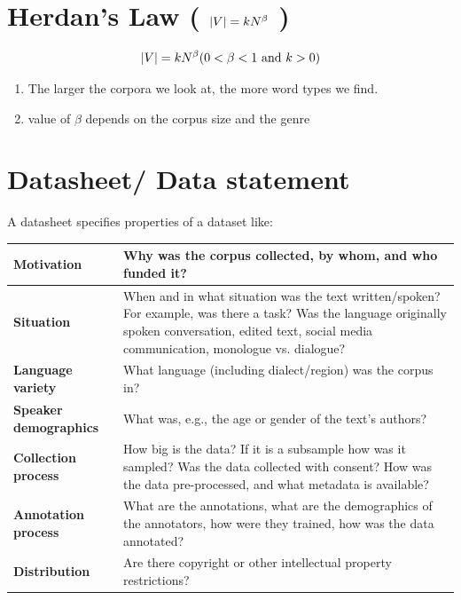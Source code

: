 \section{Herdan’s Law ( $\left| V \right| = kN^{\beta}$ ) \cite{nlp-1}} \label{Herdan’s Law}

\[
    \dabs{V} = kN^{\beta} \hfill (0 < \beta < 1 \text{ and } k > 0)
\]

\begin{enumerate}
    \item The larger the corpora we look at, the more word types we find.
    \item value of $\beta$ depends on the corpus size and the genre
\end{enumerate}

\section{Datasheet/ Data statement}\label{Datasheet/ Data statement}

A datasheet specifies properties of a dataset like:
\begin{alternateColorTable}
\renewcommand{\arraystretch}{1.3}
\begin{table}[h]
    \centering
    \begin{tabular}{|m{3.5cm}|m{11.5cm}|}
        \hline
        
        \textbf{Motivation} & Why was the corpus collected, by whom, and who funded it?  \\ 
        \hline
         
         \textbf{Situation} & When and in what situation was the text written/spoken? For example, was there a task? Was the language originally spoken conversation, edited text, social media communication, monologue vs. dialogue? \\
         \hline
         
        \textbf{Language variety} & What language (including dialect/region) was the corpus in? \\
        \hline
        
        \textbf{Speaker demographics} & What was, e.g., the age or gender of the text’s authors? \\
        \hline
        
        \textbf{Collection process} & How big is the data? If it is a subsample how was it sampled? Was the data collected with consent? How was the data pre-processed, and what metadata is available? \\
        \hline

        \textbf{Annotation process} & What are the annotations, what are the demographics of the annotators, how were they trained, how was the data annotated? \\ 
        \hline

        \textbf{Distribution} & Are there copyright or other intellectual property restrictions?\\
        \hline
        
    \end{tabular}
\end{table}
\renewcommand{\arraystretch}{1}
\end{alternateColorTable}

